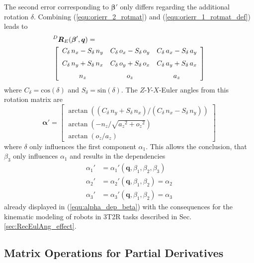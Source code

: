 \documentclass[twocolumn,10pt]{IFTOMM}
\newcommand{\bm}[1]{\boldsymbol{#1}}
\newcommand{\rotmat}[2]{{{ }^{#1}\boldsymbol{R}}_{#2}}
\begin{document}
The second error corresponding to $\bm{\beta}'$ only differs regarding the additional rotation $\delta$. Combining (\ref{equ:orierr_2_rotmat}) and (\ref{equ:orierr_1_rotmat_def}) leads to
%
\begin{align}
&\rotmat{D}{E}(\bm{\beta}',\bm{q})
= \\
&\left[ \begin {array}{ccc} { C_{\delta}}\,{n_x}-{ S_{\delta}}\,{ n_y}&{ C_{\delta}}\,{o_x}-{ S_{\delta}}\,{o_y}&{ C_{\delta}}\,{ a_x}-{ S_{\delta}}\,{a_y}\\ \noalign{\medskip}{ C_{\delta}}\,{n_y}+ { S_{\delta}}\,{n_x}&{ C_{\delta}}\,{o_y}+{ S_{\delta}}\,{o_x}&{  C_{\delta}}\,{a_y}+{ S_{\delta}}\,{a_x}\\ \noalign{\medskip}{ n_z}&{o_z}&{a_z}\end {array} \right] \nonumber
\end{align}
%
where $C_{\delta}=\mathrm{cos}(\delta)$ and $S_{\delta}=\mathrm{sin}(\delta)$.
The $Z$-$Y$-$X$-Euler angles from this rotation matrix are
%
\begin{equation}
\bm{\alpha}' =
\begin{bmatrix}
\arctan \left( ({  C_{\delta}}\,{n_y}+{ S_{\delta}}\,{n_x}) / ({ C_{\delta}}\,{n_x}-{  S_{\delta}}\,{n_y}) \right) \\
\arctan \left( -{n_z} / \sqrt {{{a_z}}^{2}+{{ o_z}}^{2}} \right) \\
\arctan \left( {o_z} / {a_z} \right)
\end{bmatrix}
\end{equation}
%
where $\delta$  only influences the first component $\alpha_1$.
This allows the conclusion, that $\beta_3$ only influences $\alpha_1$ and results in the dependencies
%
\begin{align}
\alpha_1'&=\alpha_1'(\bm{q},\beta_1,\beta_2,\beta_3)\\
\alpha_2'&=\alpha_2'(\bm{q},\beta_1,\beta_2) =\alpha_2\\
\alpha_3'&=\alpha_3'(\bm{q},\beta_1,\beta_2) =\alpha_3
\end{align}
%
already displayed in (\ref{equ:alpha_dep_beta}) with the consequences for the kinematic modeling of robots in 3T2R tasks described in Sec.\,\ref{sec:RecEulAng_effect}.

\subsection{Matrix Operations for Partial Derivatives}
\label{sec:appendix_gradient_matrix}
\end{document}
